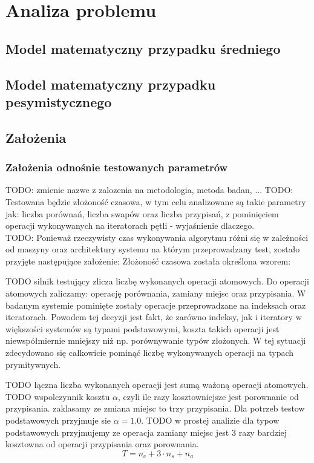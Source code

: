 \chapter{Analiza problemu}

\section{Model matematyczny przypadku średniego}

\section{Model matematyczny przypadku pesymistycznego}

\section{Założenia}

\subsection{Założenia odnośnie testowanych parametrów}
TODO: zmienic nazwe z zalozenia na metodologia, metoda badan, ...
TODO: Testowana będzie złożoność czasowa, w tym celu analizowane są takie parametry jak: liczba porównań,
liczba swapów oraz liczba przypisań, z pominięciem operacji wykonywanych na iteratorach pętli -
wyjaśnienie dlaczego.\\

TODO: Ponieważ rzeczywisty czas wykonywania algorytmu różni się w zależności od maszyny oraz architektury systemu
na którym przeprowadzany test, zostało przyjęte następujące założenie:
Złożoność czasowa została określona wzorem:

TODO silnik testujący zlicza liczbę wykonanych operacji atomowych. Do operacji atomowych zaliczamy: operację porównania, zamiany miejsc oraz przypisania. W badanym systemie pominięte zostały operacje przeprowadzane na indeksach oraz iteratorach. Powodem tej decyzji jest fakt, że zarówno indeksy, jak i iteratory w większości systemów są typami podstawowymi, koszta takich operacji jest niewspółmiernie mniejszy niż np. porównywanie typów złożonych. W tej sytuacji zdecydowano się całkowicie pominąć liczbę wykonywanych operacji na typach prymitywnych.

TODO łączna liczba wykonanych operacji jest sumą ważoną operacji atomowych.
TODO wspolczynnik kosztu \boldmath$\alpha$, czyli ile razy kosztowniejsze jest porownanie od przypisania. zaklasamy ze zmiana miejsc to trzy przypisania. Dla potrzeb testow podstawowych przyjmuje sie \boldmath$\alpha = 1.0$.
TODO w prostej analizie dla typow podstawowych przyjmujemy ze operacja zamiany miejsc jest 3 razy bardziej kosztowna od operacji przypisania oraz porownania.
\boldmath$$T = n_c + 3 \cdot n_s + n_a $$

